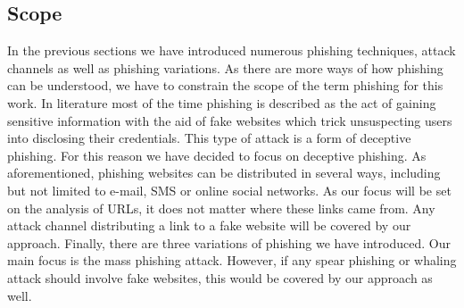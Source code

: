 \subsection{Scope}
\label{s:scope}
In the previous sections we have introduced numerous phishing techniques, attack channels as well as phishing variations. As there are more ways of how phishing can be understood, we have to constrain the scope of the term phishing for this work. In literature most of the time phishing is described as the act of gaining sensitive information with the aid of fake websites which trick unsuspecting users into disclosing their credentials.
This type of attack is a form of deceptive phishing. For this reason we have decided to focus on deceptive phishing. As aforementioned, phishing websites can be distributed in several ways, including but not limited to e-mail, SMS or online social networks. As our focus will be set on the analysis of URLs, it does not matter where these links came from. Any attack channel distributing a link to a fake website will be covered by our approach. Finally, there are three variations of phishing we have introduced. Our main focus is the mass phishing attack. However, if any spear phishing or whaling attack should involve fake websites, this would be covered by our approach as well.

